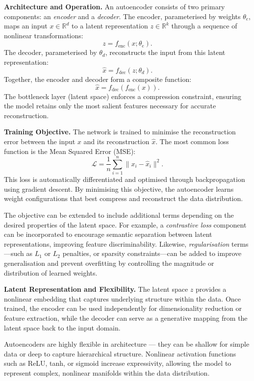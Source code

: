 \vspace{0.5em}
\noindent
\textbf{Architecture and Operation.}
An autoencoder consists of two primary components: an \textit{encoder} and a \textit{decoder}. The encoder, parameterised by weights \( \theta_e \), maps an input \( x \in \mathbb{R}^d \) to a latent representation \( z \in \mathbb{R}^k \) through a sequence of nonlinear transformations:
\[
z = f_\text{enc}(x; \theta_e).
\]
The decoder, parameterised by \( \theta_d \), reconstructs the input from this latent representation:
\[
\hat{x} = f_\text{dec}(z; \theta_d).
\]
Together, the encoder and decoder form a composite function:
\[
\hat{x} = f_\text{dec}(f_\text{enc}(x)).
\]
The bottleneck layer (latent space) enforces a compression constraint, ensuring the model retains only the most salient features necessary for accurate reconstruction.

\vspace{0.5em}
\noindent
\textbf{Training Objective.}
The network is trained to minimise the reconstruction error between the input \( x \) and its reconstruction \( \hat{x} \). The most common loss function is the Mean Squared Error (MSE):
\[
\mathcal{L} = \frac{1}{n} \sum_{i=1}^{n} \| x_i - \hat{x}_i \|^2.
\]
This loss is automatically differentiated and optimised through backpropagation using gradient descent. By minimising this objective, the autoencoder learns weight configurations that best compress and reconstruct the data distribution.

The objective can be extended to include additional terms depending on the desired properties of the latent space. For example, a \textit{contrastive loss} component can be incorporated to encourage semantic separation between latent representations, improving feature discriminability. Likewise, \textit{regularisation} terms—such as \( L_1 \) or \( L_2 \) penalties, or sparsity constraints—can be added to improve generalisation and prevent overfitting by controlling the magnitude or distribution of learned weights.


\vspace{0.5em}
\noindent
\textbf{Latent Representation and Flexibility.}
The latent space \( z \) provides a nonlinear embedding that captures underlying structure within the data. Once trained, the encoder can be used independently for dimensionality reduction or feature extraction, while the decoder can serve as a generative mapping from the latent space back to the input domain.

Autoencoders are highly flexible in architecture — they can be shallow for simple data or deep to capture hierarchical structure. Nonlinear activation functions such as ReLU, tanh, or sigmoid increase expressivity, allowing the model to represent complex, nonlinear manifolds within the data distribution.

